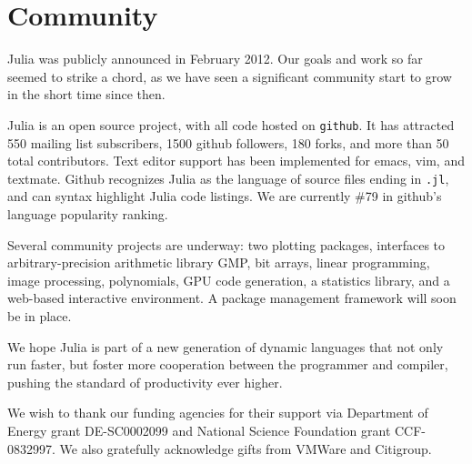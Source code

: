 \documentclass[9pt]{sigplanconf}
\begin{document}
\section{Community}

Julia was publicly announced in February 2012. Our goals and work so
far seemed to strike a chord, as we have seen a significant community
start to grow in the short time since then.

Julia is an open source project, with all code hosted on {\tt github}.
It has attracted 550 mailing list subscribers, 1500 github followers,
180 forks, and more than 50 total contributors. Text editor support
has been implemented for emacs, vim, and textmate.
Github recognizes Julia as the language of source files ending in
{\tt .jl}, and can syntax highlight Julia code listings.
We are currently \#79 in github's language popularity ranking.

Several community projects are underway: two plotting packages,
interfaces to arbitrary-precision arithmetic library GMP,
bit arrays, linear programming, image processing, polynomials,
GPU code generation, a statistics library, and a web-based interactive
environment. A package management framework will soon be in place.

We hope Julia is part of a new generation of dynamic languages that not
only run faster, but foster more cooperation between the programmer
and compiler, pushing the standard of productivity ever higher.






\acks 
We wish to thank our funding agencies for their support via
Department of Energy grant DE-SC0002099 and National Science Foundation
grant CCF-0832997. We also gratefully acknowledge gifts from
VMWare and Citigroup.




%
\end{document}
